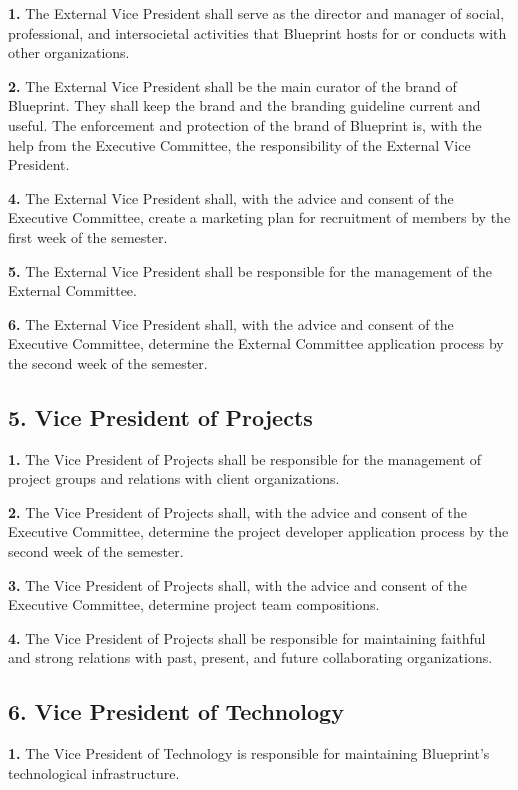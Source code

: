 \documentclass{article}
\begin{document}
\textbf{1.} The External Vice President shall serve as the director and manager of social, professional, and intersocietal activities that Blueprint hosts for or conducts with other organizations. 

\textbf{2.} The External Vice President shall be the main curator of the brand of Blueprint. They shall keep the brand and the branding guideline current and useful. The enforcement and protection of the brand of Blueprint is, with the help from the Executive Committee, the responsibility of the External Vice President.

\textbf{4.} The External Vice President shall, with the advice and consent of the Executive Committee, create a marketing plan for recruitment of members by the first week of the semester.

\textbf{5.} The External Vice President shall be responsible for the management of the External Committee.

\textbf{6.} The External Vice President shall, with the advice and consent of the Executive Committee, determine the External Committee application process by the second week of the semester.

\subsection{5. Vice President of Projects}

\textbf{1.} The Vice President of Projects shall be responsible for the management of project groups and relations with client organizations.

\textbf{2.} The Vice President of Projects shall, with the advice and consent of the Executive Committee, determine the project developer application process by the second week of the semester.

\textbf{3.} The Vice President of Projects shall, with the advice and consent of the Executive Committee, determine project team compositions.

\textbf{4.} The Vice President of Projects shall be responsible for maintaining faithful and strong relations with past, present, and future collaborating organizations.

\subsection{6. Vice President of Technology}

\textbf{1.} The Vice President of Technology is responsible for maintaining Blueprint's technological infrastructure.
\end{document}
